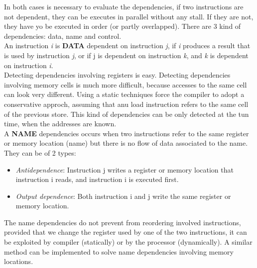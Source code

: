 \documentclass[12pt]{article}
\begin{document}
In both cases is necessary to evaluate the dependencies, if two instructions are not dependent, they can be executes in parallel without any stall. If they are not, they have yo be executed in order (or partly overlapped). There are 3 kind of dependencies: data, name and control.\\
An instruction \textit{i} is \textbf{DATA} dependent on instruction \textit{j}, if \textit{i} produces a result that is used by instruction \textit{j}, or if j is dependent on instruction \textit{k}, and \textit{k} is dependent on instruction \textit{i}.\\
Detecting dependencies involving registers is easy. Detecting dependencies involving memory cells is much more difficult, because accesses to the same cell can look very different. Using a static techniques force the compiler to adopt a conservative approch, assuming that anu load instruction refers to the same cell of the previous store. This kind of dependencies can be only detected at the tun time, when the addresses are known.\\
A \textbf{NAME} dependencies occurs when two instructions refer to the same register or memory location (name) but there is no flow of data associated to the name. They can be of 2 types:
\begin{itemize}
  \item \textit{Antidependence}: Instruction j writes a register or memory location that instruction i reads, and instruction i is executed first.
  \item \textit{Output dependence}: Both instruction i and j write the same register or memory location.
\end{itemize}
The name dependencies do not prevent from reordering involved instructions, provided that we change the register used by one of the two instructions, it can be exploited by compiler (statically) or by the processor (dynamically). A similar method can be implemented to solve name dependencies involving memory locations.
\end{document}
